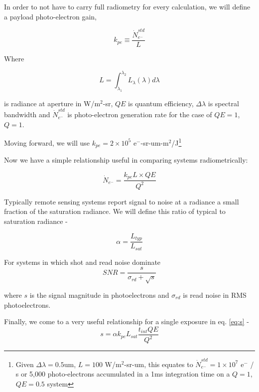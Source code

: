 \documentclass[10pt,journal]{IEEEtran}  %
\begin{document}
In order to not have to carry full radiometry for every calculation, we will define a payload photo-electron gain, 

\begin{equation}
k_{pe} \equiv \frac{\dot{N}_{e^-}^{std}}{L}
\label{eq:k_pe}
\end{equation}

Where 

\begin{equation*}
    L = \int_{\lambda_1}^{\lambda_2}L_{\lambda}(\lambda)d\lambda
\end{equation*}

is radiance at aperture in W/m$^2$-sr, $QE$ is quantum efficiency, $\Delta \lambda$ is spectral bandwidth and $\dot{N}_{e^-}^{std}$ is photo-electron generation rate for the case of $QE=1$, $Q=1$.

Moving forward, we will use $k_{pe} = 2\times 10^5$ e$^-$-sr-um-m$^2$/J\footnote{Given $\Delta \lambda = 0.5$um, $L = 100$ W/m$^2$-sr-um, this equates to $\dot{N}_{e^-}^{std} = 1\times 10^7$ e$^-$ / s or 5,000 photo-electrons accumulated in a 1ms integration time on a $Q=1$, $QE=0.5$ system}

Now we have a simple relationship useful in comparing systems radiometrically:

\begin{equation}
\dot{N}_{e^-} = \frac{k_{pe} L \times QE}{Q^2}
\label{eq:N_e_dot}
\end{equation}

Typically remote sensing systems report signal to noise at a radiance a small fraction of the saturation radiance.  We will define this ratio of typical to saturation radiance - 

\begin{equation}
\alpha = \frac{L_{typ}}{L_{sat}}
\label{eq:alpha}
\end{equation}

For systems in which shot and read noise dominate
\begin{equation}
SNR = \frac{s}{\sigma_{rd} + \sqrt{s}}
\label{eq:snr}
\end{equation}

where $s$ is the signal magnitude in photoelectrons and $\sigma_{rd}$ is read noise in RMS photoelectrons.

Finally, we come to a very useful relationship for a single exposure in eq. \ref{eq:s} -
\begin{equation}
s = \alpha k_{pe}L_{sat} \frac{t_{int}QE}{Q^2}
\label{eq:s}
\end{equation}
\end{document}
